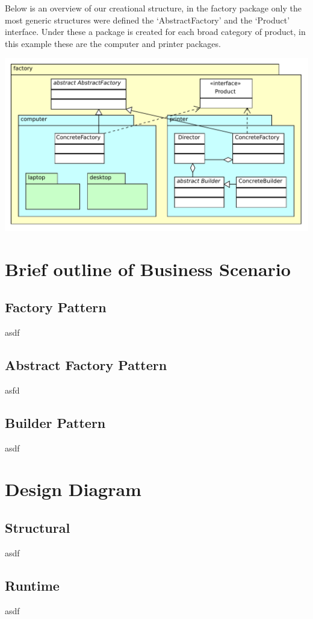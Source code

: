 \documentclass[pdftex,11pt,a4paper]{article}
\begin{document}
Below is an overview of our creational structure, in the factory package only the most generic structures were defined the ‘AbstractFactory’ and the ‘Product’ interface. Under these a package is created for each broad category of product, in this example these are the computer and printer packages.

\begin{center}
	\includegraphics[scale=0.75]{images/creational_diagram.pdf}
\end{center}

\pagebreak

\section{Brief outline of Business Scenario}
\subsection{Factory Pattern}
asdf
\subsection{Abstract Factory Pattern}
asfd
\subsection{Builder Pattern}
asdf
\pagebreak

\section{Design Diagram}
\subsection{Structural}
asdf
\subsection{Runtime}
asdf
\pagebreak
\end{document}
